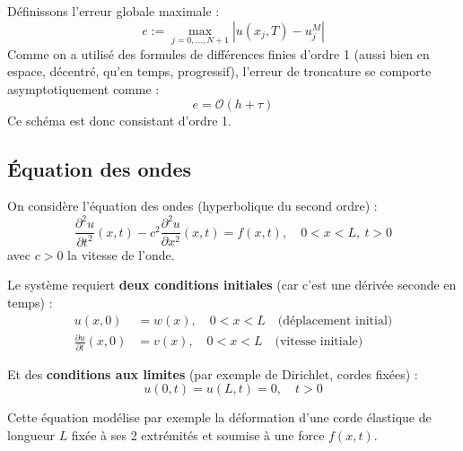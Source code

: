 \begin{remarque}
Définissons l'erreur globale maximale :
\begin{equation*}
e := \max_{j=0,\dots,N+1} |u(x_j, T) - u_j^M|
\end{equation*}
Comme on a utilisé des formules de différences finies d'ordre 1 (aussi bien en espace, décentré, qu'en temps, progressif), l'erreur de troncature se comporte asymptotiquement comme :
\begin{equation*}
e = \mathcal{O}(h + \tau)
\end{equation*}
Ce schéma est donc consistant d'ordre 1.
\end{remarque}

\vspace{1cm}

\subsection{Équation des ondes}

On considère l'équation des ondes (hyperbolique du second ordre) :
\begin{equation}
\label{eq:ondes}
\frac{\partial^2 u}{\partial t^2}(x,t) - c^2 \frac{\partial^2 u}{\partial x^2}(x,t) = f(x,t), \quad 0 < x < L, \ t > 0
\end{equation}
avec $c > 0$ la vitesse de l'onde.

Le système requiert \textbf{deux conditions initiales} (car c'est une dérivée seconde en temps) :
\begin{align*}
u(x,0) &= w(x), \quad 0 < x < L \quad \text{(déplacement initial)} \\
\frac{\partial u}{\partial t}(x,0) &= v(x), \quad 0 < x < L \quad \text{(vitesse initiale)}
\end{align*}

Et des \textbf{conditions aux limites} (par exemple de Dirichlet, cordes fixées) :
\begin{equation*}
u(0,t) = u(L,t) = 0, \quad t > 0
\end{equation*}

Cette équation modélise par exemple la déformation d'une corde élastique de longueur $L$ fixée à ses 2 extrémités et soumise à une force $f(x,t)$.

